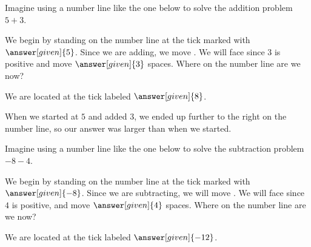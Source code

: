 \documentclass{ximera}
\begin{document}
\begin{example}
Imagine using a number line like the one below to solve the addition problem $5 + 3$.
\begin{center}
\end{center}
We begin by standing on the number line at the tick marked with $\answer[given]{5}$.  Since we are adding, we move 
.  We will face 
 since $3$ is positive and move $\answer[given]{3}$ spaces.  
Where on the number line are we now? 

\begin{prompt}
We are located at the tick labeled $\answer[given]{8}$.
\end{prompt}
\end{example}

When we started at $5$ and added $3$, we ended up further to the right on the number line, so our answer was larger than when we started.


\begin{example}
Imagine using a number line like the one below to solve the subtraction problem $-8 - 4$.
\begin{center}
\end{center}
We begin by standing on the number line at the tick marked with $\answer[given]{-8}$.  Since 
we are subtracting, we will move .  We 
will face  since $4$ is positive, and move 
$\answer[given]{4}$ spaces.  Where on the number line are we now? 

\begin{prompt}
We are located at the tick labeled $\answer[given]{-12}$.
\end{prompt}
\end{example}
\end{document}
